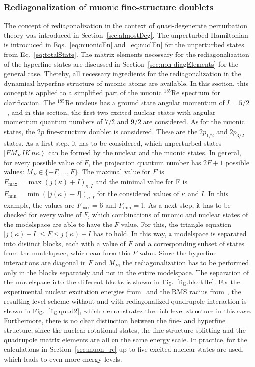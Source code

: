 \subsubsection{Rediagonalization of muonic fine-structure doublets}
\label{sec:toyModelRediag}
The concept of rediagonalization in the context of quasi-degenerate perturbation theory was introduced in Section~\ref{sec:almostDeg}. The unperturbed Hamiltonian is introduced in Eqs.~\eqref{eq:muonicEn} and~\eqref{eq:nuclEn} for the unperturbed states from Eq.~\eqref{eq:totalState}. The matrix elements necessary for the rediagonalization of the hyperfine states are discussed in Section~\ref{sec:non-diagElements} for the general case. Thereby, all necessary ingredients for the rediagonalization in the dynamical hyperfine structure of muonic atoms are available. In this section, this concept is applied to a simplified part of the muonic $^{185}$Re spectrum for clarification. The $^{185}$Re nucleus has a ground state angular momentum of $I=5/2$~\cite{Stone2005}, and in this section, the first two excited nuclear states with angular momentum quantum numbers of $7/2$ and $9/2$ are considered. As for the muonic states, the $2p$ fine-structure doublet is considered. These are the $2p_{1/2}$ and $2p_{3/2}$ states.
As a first step, it has to be considered, which unperturbed states $\left|FM_F\,IK\,n\kappa\right>$ can be formed by the nuclear and the muonic states. In general, for every possible value of $F$, the projection quantum number has $2F+1$ possible values: $M_F\in \{-F,...,F\}$. The maximal value for $F$ is $F_{\text{max}}=\max(j(\kappa)+I)_{\kappa, I}$ and the minimal value for F is $F_{\text{min}}=\min(|j(\kappa)-I|)_{\kappa, I}$ for the considered values of $\kappa$ and $I$. In this example, the values are $F_{\text{max}}=6$ and $F_{\text{min}}=1$. As a next step, it has to be checked for every value of $F$, which combinations of muonic and nuclear states of the modelspace are able to have the $F$ value. For this, the triangle equation $|j(\kappa)-I|\leq F \leq j(\kappa)+I$ has to hold. In this way, a modelspace is separated into distinct blocks, each with a value of $F$ and a corresponding subset of states from the modelspace, which can form this $F$ value. Since the hyperfine interactions are diagonal in $F$ and $M_F$, the rediagonalization has to be performed only in the blocks separately and not in the entire modelspace. The separation of the modelspace into the different blocks is shown in Fig.~\ref{fig:blockRe}. For the experimental nuclear excitation energies from~\cite{ENSDF} and the RMS radius from~\cite{Angeli2013}, the resulting level scheme without and with rediagonalized quadrupole interaction is shown in Fig.~\ref{fig:quad2}, which demonstrates the rich level structure in this case. Furthermore, there is no clear distinction between the fine- and hyperfine structure, since the nuclear rotational states, the fine-structure splitting and the quadrupole matrix elements are all on the same energy scale. In practice, for the calculations in Section~\ref{sec:muon_re} up to five excited nuclear states are used, which leads to even more energy levels.

